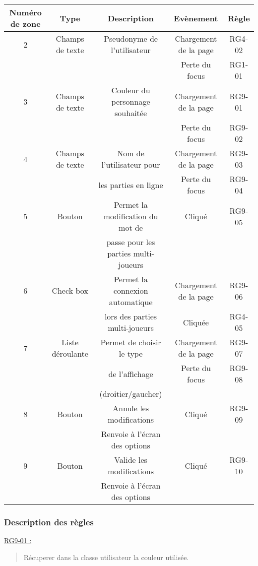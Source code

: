 \documentclass{report}
\begin{document}
			\begin{tabular}{|c|c|c|c|c|} \hline
				Numéro de zone & Type  & Description & Evènement &	Règle \\\hline
				2 & Champs de texte & Pseudonyme de l'utilisateur & Chargement de la page & RG4-02 \\
				  &                 &                             & Perte du focus & RG1-01 \\\hline
				3 & Champs de texte & Couleur du personnage souhaitée & Chargement de la page & RG9-01 \\
				  &                 &                             & Perte du focus & RG9-02 \\\hline
				4 & Champs de texte & Nom de l'utilisateur pour & Chargement de la page & RG9-03 \\
				  &                 & les parties en ligne      & Perte du focus & RG9-04 \\\hline
				5 & Bouton & Permet la modification du mot de & Cliqué & RG9-05 \\
				  &        & passe pour les parties multi-joueurs & & \\\hline
				6 & Check box & Permet la connexion automatique & Chargement de la page & RG9-06 \\
				  &           & lors des parties multi-joueurs  & Cliquée               & RG4-05 \\\hline
				7 & Liste déroulante & Permet de choisir le type & Chargement de la page & RG9-07 \\
				  &				     & de l'affichage            & Perte du focus & RG9-08 \\
				  &				     & (droitier/gaucher)        & & \\\hline
				8 & Bouton & Annule les modifications & Cliqué & RG9-09 \\
				  &        & Renvoie à l'écran des options &   &        \\\hline
				9 & Bouton & Valide les modifications & Cliqué & RG9-10 \\
				  &        & Renvoie à l'écran des options &   &        \\\hline
			\end{tabular}
			
		\subsubsection{Description des règles}

			\underline{RG9-01 :}
				\begin{quote}
					Récuperer dans la classe utilisateur la couleur utilisée.\\
				\end{quote}
\end{document}
